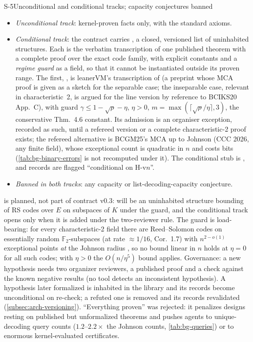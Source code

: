 \begin{decision}{S-5}{Unconditional and conditional tracks; capacity conjectures banned}
\begin{itemize}[nosep,leftmargin=1em]
\item \emph{Unconditional track}: kernel-proven facts only, with the standard axioms.
\item \emph{Conditional track}: the contract carries , a closed, versioned
  list of uninhabited structures. Each is the verbatim transcription of one published theorem
  with a complete proof over the exact code family, with explicit constants and a \emph{regime
  guard} as a field, so that it cannot be instantiated outside its proven range. The first,
  , is leanerVM's transcription of \cite[Thm.~4.6]{BCHKS25} (a preprint whose MCA
  proof is given as a sketch for the separable case; the inseparable case, relevant in
  characteristic~2, is argued for the line version by reference to BCIKS20 App.~C), with guard
  $\gamma\le1-\sqrt\rho-\eta$, $\eta>0$, $m=\max(\lceil\sqrt\rho/\eta\rceil,3)$, the conservative
  Thm.~4.6 constant. Its admission is an organiser exception, recorded as such, until a refereed
  version or a complete characteristic-2 proof exists; the refereed alternative is BCGM25's MCA up
  to Johnson \cite{BCGM25-MCA} (CCC 2026, any finite field), whose exceptional count is quadratic
  in $n$ and costs bits (\cref{tab:bg-binary-errors} is not recomputed under it). The conditional stub is
  , and records are flagged
  \enquote{conditional on H-v$n$}.
\item \emph{Banned in both tracks}: any capacity or list-decoding-capacity conjecture.
\end{itemize}
\end{decision}


\noindent {} is planned, not part of contract v0.3:  will be an
uninhabited  structure bounding  of RS codes over $E$ on subspaces of $K$
under the guard, and the conditional track opens only when it is added under the two-reviewer rule. The guard is load-bearing: for every characteristic-2 field there are Reed--Solomon
codes on essentially random $\mathbb{F}_2$-subspaces (at rate $\approx1/16$, Cor.~1.7) with
$n^{2-o(1)}$ exceptional points \emph{at} the Johnson radius \cite[Thm.~1.6, Cor.~1.7]{BCHKS25}, so
no bound linear in $n$ holds at $\eta=0$ for all such codes; with $\eta>0$ the $O(n/\eta^5)$ bound applies. Governance: a new hypothesis needs two
organizer reviewers, a published proof and a check against the known negative results (no tool
detects an inconsistent hypothesis). A hypothesis later formalized is inhabited in the library and
its records become unconditional on re-check; a refuted one is removed and its records revalidated
(\cref{subsec:arch-versioning}). \enquote{Everything proven} was rejected: it penalizes designs
resting on published but unformalized theorems and pushes agents to unique-decoding query counts
($1.2$--$2.2\times$ the Johnson counts, \cref{tab:bg-queries}) or to
enormous kernel-evaluated certificates.

